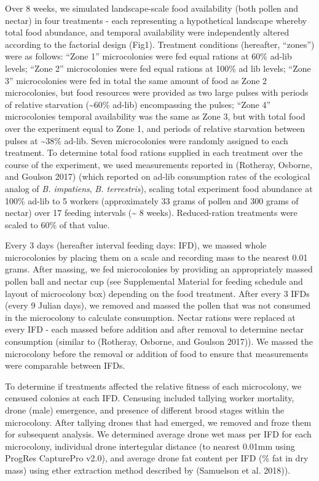 \documentclass[11pt,]{article}
\begin{document}
Over 8 weeks, we simulated landscape-scale food availability (both
pollen and nectar) in four treatments - each representing a hypothetical
landscape whereby total food abundance, and temporal availability were
independently altered according to the factorial design (Fig1).
Treatment conditions (hereafter, ``zones'') were as follows: ``Zone 1''
microcolonies were fed equal rations at 60\% ad-lib levels; ``Zone 2''
microcolonies were fed equal rations at 100\% ad lib levels; ``Zone 3''
microcolonies were fed in total the same amount of food as Zone 2
microcolonies, but food resources were provided as two large pulses with
periods of relative starvation (\textasciitilde{}60\% ad-lib)
encompassing the pulses; ``Zone 4'' microcolonies temporal availability
was the same as Zone 3, but with total food over the experiment equal to
Zone 1, and periods of relative starvation between pulses at
\textasciitilde{}38\% ad-lib. Seven microcolonies were randomly assigned
to each treatment. To determine total food rations supplied in each
treatment over the course of the experiment, we used measurements
reported in (Rotheray, Osborne, and Goulson 2017) (which reported on
ad-lib consumption rates of the ecological analog of \emph{B.
impatiens}, \emph{B. terrestris}), scaling total experiment food
abundance at 100\% ad-lib to 5 workers (approximately 33 grams of pollen
and 300 grams of nectar) over 17 feeding intervals (\textasciitilde{} 8
weeks). Reduced-ration treatments were scaled to 60\% of that value.

Every 3 days (hereafter interval feeding days: IFD), we massed whole
microcolonies by placing them on a scale and recording mass to the
nearest 0.01 grams. After massing, we fed microcolonies by providing an
appropriately massed pollen ball and nectar cup (see Supplemental
Material for feeding schedule and layout of microcolony box) depending
on the food treatment. After every 3 IFDs (every 9 Julian days), we
removed and massed the pollen that was not consumed in the microcolony
to calculate consumption. Nectar rations were replaced at every IFD -
each massed before addition and after removal to determine nectar
consumption (similar to (Rotheray, Osborne, and Goulson 2017)). We
massed the microcolony before the removal or addition of food to ensure
that measurements were comparable between IFDs.

To determine if treatments affected the relative fitness of each
microcolony, we censused colonies at each IFD. Censusing included
tallying worker mortality, drone (male) emergence, and presence of
different brood stages within the microcolony. After tallying drones
that had emerged, we removed and froze them for subsequent analysis. We
determined average drone wet mass per IFD for each microcolony,
individual drone intertegular distance (to nearest 0.01mm using ProgRes
CapturePro v2.0), and average drone fat content per IFD (\% fat in dry
mass) using ether extraction method described by (Samuelson et al.
2018)).
\end{document}
